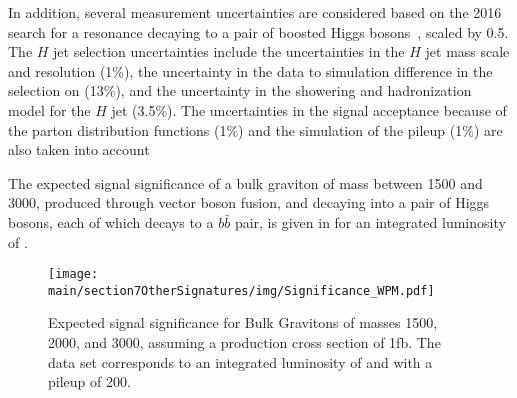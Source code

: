 In addition, several measurement uncertainties are considered based on the 2016 search for a resonance decaying to a pair of boosted Higgs bosons~\cite{CMS-B2G-16-026}, scaled by 0.5. 
The $ H $ jet selection uncertainties include the uncertainties in the $ H $ jet mass scale and resolution (1\%), the uncertainty in the data to simulation difference in the selection on \nsub (13\%), and the uncertainty in the showering and hadronization model for the $ H $ jet (3.5\%). 
The uncertainties in the signal acceptance because of the parton distribution functions (1\%) and the simulation of the pileup (1\%) are also taken into account

The expected signal significance of a bulk graviton of mass between 1500 and 3000\GeV, produced through vector boson fusion, and decaying into a pair of Higgs bosons, each of which decays to a  $b\bar{b}$ pair, is given in  for an integrated luminosity of \intLumi.

\begin{figure}[htbp]
  \begin{center}
    \texttt{[image: \\main/section7OtherSignatures/img/Significance\_WPM.pdf]}
    \caption{Expected signal significance for Bulk Gravitons of masses 1500, 2000, and 3000\GeV, assuming a production cross section of 1\unit{fb}. The data set corresponds to an integrated luminosity of \intLumi and with a pileup of 200.}
    \label{fig:sigSig}
  \end{center}
\end{figure}








